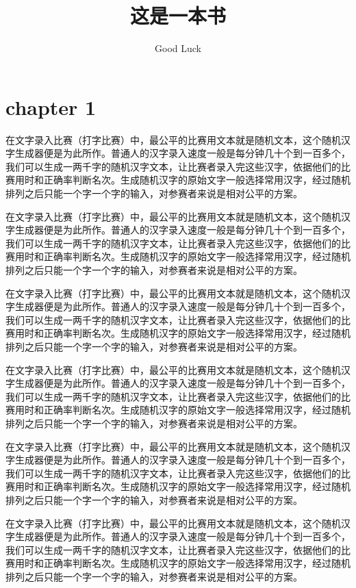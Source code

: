 \documentclass[12pt,hyperref,UTF8]{ctexbook}
\title{这是一本书}                              %
\author{Good Luck}                              %
\begin{document}
\maketitle                        %
\tableofcontents                  %

\cleardoublepage
\chapter{chapter 1}

在文字录入比赛（打字比赛）中，最公平的比赛用文本就是随机文本，这个随机汉字生成器便是为此所作。普通人的汉字录入速度一般是每分钟几十个到一百多个，我们可以生成一两千字的随机汉字文本，让比赛者录入完这些汉字，依据他们的比赛用时和正确率判断名次。生成随机汉字的原始文字一般选择常用汉字，经过随机排列之后只能一个字一个字的输入，对参赛者来说是相对公平的方案。

在文字录入比赛（打字比赛）中，最公平的比赛用文本就是随机文本，这个随机汉字生成器便是为此所作。普通人的汉字录入速度一般是每分钟几十个到一百多个，我们可以生成一两千字的随机汉字文本，让比赛者录入完这些汉字，依据他们的比赛用时和正确率判断名次。生成随机汉字的原始文字一般选择常用汉字，经过随机排列之后只能一个字一个字的输入，对参赛者来说是相对公平的方案。

在文字录入比赛（打字比赛）中，最公平的比赛用文本就是随机文本，这个随机汉字生成器便是为此所作。普通人的汉字录入速度一般是每分钟几十个到一百多个，我们可以生成一两千字的随机汉字文本，让比赛者录入完这些汉字，依据他们的比赛用时和正确率判断名次。生成随机汉字的原始文字一般选择常用汉字，经过随机排列之后只能一个字一个字的输入，对参赛者来说是相对公平的方案。

在文字录入比赛（打字比赛）中，最公平的比赛用文本就是随机文本，这个随机汉字生成器便是为此所作。普通人的汉字录入速度一般是每分钟几十个到一百多个，我们可以生成一两千字的随机汉字文本，让比赛者录入完这些汉字，依据他们的比赛用时和正确率判断名次。生成随机汉字的原始文字一般选择常用汉字，经过随机排列之后只能一个字一个字的输入，对参赛者来说是相对公平的方案。

在文字录入比赛（打字比赛）中，最公平的比赛用文本就是随机文本，这个随机汉字生成器便是为此所作。普通人的汉字录入速度一般是每分钟几十个到一百多个，我们可以生成一两千字的随机汉字文本，让比赛者录入完这些汉字，依据他们的比赛用时和正确率判断名次。生成随机汉字的原始文字一般选择常用汉字，经过随机排列之后只能一个字一个字的输入，对参赛者来说是相对公平的方案。

在文字录入比赛（打字比赛）中，最公平的比赛用文本就是随机文本，这个随机汉字生成器便是为此所作。普通人的汉字录入速度一般是每分钟几十个到一百多个，我们可以生成一两千字的随机汉字文本，让比赛者录入完这些汉字，依据他们的比赛用时和正确率判断名次。生成随机汉字的原始文字一般选择常用汉字，经过随机排列之后只能一个字一个字的输入，对参赛者来说是相对公平的方案。
\end{document}
